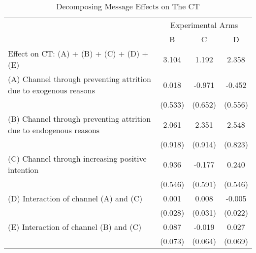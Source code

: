 \documentclass[12pt, a4paper]{article}
\begin{document}
\begin{table}[H]

\caption{\label{tab:decompose-ct}Decomposing Message Effects on The CT}
\centering
\fontsize{8}{10}\selectfont
\begin{threeparttable}
\begin{tabular}[t]{lccc}
\toprule
\multicolumn{1}{c}{ } & \multicolumn{3}{c}{Experimental Arms} \\
\cmidrule(l{3pt}r{3pt}){2-4}
 & B & C & D\\
\midrule
Effect on CT: (A) + (B) + (C) + (D) + (E) & 3.104 & 1.192 & 2.358\\
(A) Channel through preventing attrition due to exogenous reasons & 0.018 & -0.971 & -0.452\\
 & (0.533) & (0.652) & (0.556)\\
(B) Channel through preventing attrition due to endogenous reasons & 2.061 & 2.351 & 2.548\\
 & (0.918) & (0.914) & (0.823)\\
(C) Channel through increasing positive intention & 0.936 & -0.177 & 0.240\\
 & (0.546) & (0.591) & (0.546)\\
(D) Interaction of channel (A) and (C) & 0.001 & 0.008 & -0.005\\
 & (0.028) & (0.031) & (0.022)\\
(E) Interaction of channel (B) and (C) & 0.087 & -0.019 & 0.027\\
 & (0.073) & (0.064) & (0.069)\\
\bottomrule
\end{tabular}
\begin{tablenotes}
\item 
\end{tablenotes}
\end{threeparttable}
\end{table}
\end{document}
